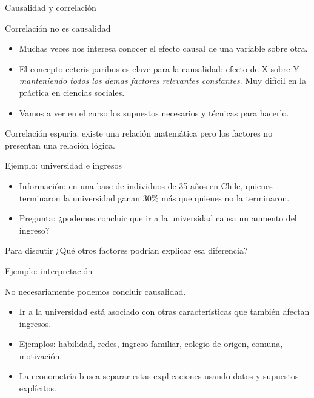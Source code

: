 \documentclass{beamer}
\begin{document}
\begin{frame}{Causalidad y correlación}

{\color{blue}    Correlaci\'on no es causalidad}
\begin{itemize}
    \item  Muchas veces nos interesa conocer el efecto causal de una variable sobre otra.
    \item  El concepto {\color{blue} ceteris paribus } es clave para la causalidad: efecto de X sobre Y
{\it manteniendo todos los demas factores relevantes constantes}.
 Muy dif\'icil en la pr\'actica en ciencias sociales.
 \item  Vamos a ver en el curso los supuestos necesarios y t\'ecnicas para
hacerlo.
\end{itemize}
{\color{blue}Correlaci\'on espuria:} existe una relación matem\'atica pero los factores no
presentan una relaci\'on l\'ogica.
\end{frame}

\begin{frame}{Ejemplo: universidad e ingresos}
\begin{itemize}
\item Información: en una base de individuos de 35 años en Chile, quienes terminaron la universidad ganan 30\% más que quienes no la terminaron.
\item Pregunta: ¿podemos concluir que ir a la universidad causa un aumento del ingreso?
\end{itemize}

\begin{block}{Para discutir}
¿Qué otros factores podrían explicar esa diferencia?
\end{block}
\end{frame}


\begin{frame}{Ejemplo: interpretación}

No necesariamente podemos concluir causalidad.
\begin{itemize}
    \item Ir a la universidad está asociado con otras características que también afectan ingresos.
    \item Ejemplos: habilidad, redes, ingreso familiar, colegio de origen, comuna, motivación.
    \item La econometría busca separar estas explicaciones usando datos y supuestos explícitos.
\end{itemize}
    
\end{frame}
\end{document}

